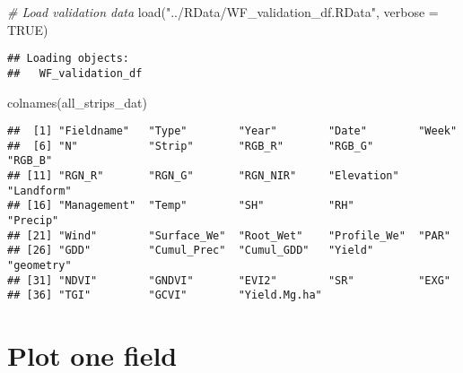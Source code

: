 \documentclass[
]{article}
\newenvironment{Shaded}{\begin{snugshade}}{\end{snugshade}}
\newcommand{\AttributeTok}[1]{\textcolor[rgb]{0.77,0.63,0.00}{#1}}
\newcommand{\CommentTok}[1]{\textcolor[rgb]{0.56,0.35,0.01}{\textit{#1}}}
\newcommand{\ConstantTok}[1]{\textcolor[rgb]{0.00,0.00,0.00}{#1}}
\newcommand{\FunctionTok}[1]{\textcolor[rgb]{0.00,0.00,0.00}{#1}}
\newcommand{\NormalTok}[1]{#1}
\newcommand{\StringTok}[1]{\textcolor[rgb]{0.31,0.60,0.02}{#1}}
\begin{document}
\begin{Shaded}
\begin{Highlighting}[]
\CommentTok{\# Load validation data}
\FunctionTok{load}\NormalTok{(}\StringTok{"../RData/WF\_validation\_df.RData"}\NormalTok{, }\AttributeTok{verbose =} \ConstantTok{TRUE}\NormalTok{)}
\end{Highlighting}
\end{Shaded}

\begin{verbatim}
## Loading objects:
##   WF_validation_df
\end{verbatim}

\begin{Shaded}
\begin{Highlighting}[]
\FunctionTok{colnames}\NormalTok{(all\_strips\_dat)}
\end{Highlighting}
\end{Shaded}

\begin{verbatim}
##  [1] "Fieldname"   "Type"        "Year"        "Date"        "Week"       
##  [6] "N"           "Strip"       "RGB_R"       "RGB_G"       "RGB_B"      
## [11] "RGN_R"       "RGN_G"       "RGN_NIR"     "Elevation"   "Landform"   
## [16] "Management"  "Temp"        "SH"          "RH"          "Precip"     
## [21] "Wind"        "Surface_We"  "Root_Wet"    "Profile_We"  "PAR"        
## [26] "GDD"         "Cumul_Prec"  "Cumul_GDD"   "Yield"       "geometry"   
## [31] "NDVI"        "GNDVI"       "EVI2"        "SR"          "EXG"        
## [36] "TGI"         "GCVI"        "Yield.Mg.ha"
\end{verbatim}

\hypertarget{plot-one-field}{%
\section{Plot one field}\label{plot-one-field}}
\end{document}
